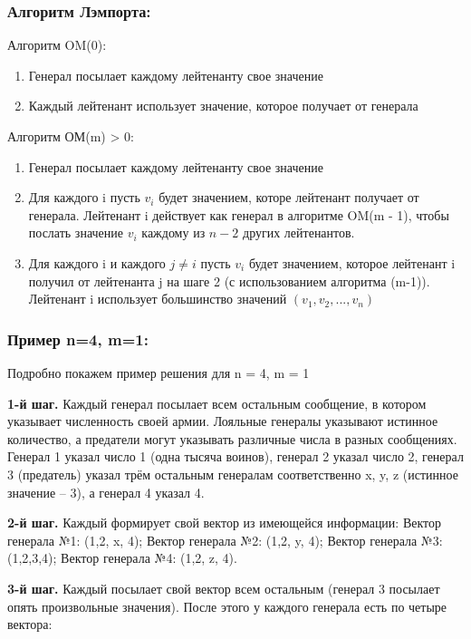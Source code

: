 \documentclass[a4paper,12pt]{article}
\begin{document}
\subsubsection{Алгоритм Лэмпорта:}

Алгоритм OM(0):
\begin{enumerate}
    \item Генерал посылает каждому лейтенанту свое значение
    \item Каждый лейтенант использует значение, которое получает от генерала
\end{enumerate}

Алгоритм ОМ(m) > 0:
\begin{enumerate}
    \item Генерал посылает каждому лейтенанту свое значение
    \item Для каждого i пусть $v_i$ будет значением, которе лейтенант получает
        от генерала. Лейтенант i действует как генерал в алгоритме OM(m - 1),
        чтобы послать значение $v_i$ каждому из $n-2$ других лейтенантов.
    \item Для каждого i и каждого $j \neq i$ пусть $v_i$ будет значением,
        которое лейтенант i получил от лейтенанта j на шаге 2 (с использованием
        алгоритма (m-1)). Лейтенант i использует большинство значений 
        $(v_1, v_2, ..., v_n)$
\end{enumerate}

\subsubsection{Пример n=4, m=1:}
Подробно покажем пример решения для n = 4, m = 1

\textbf{1-й шаг.} Каждый генерал посылает всем остальным сообщение, в котором указывает
численность своей армии. Лояльные генералы указывают истинное количество, а предатели
могут указывать различные числа в разных сообщениях. Генерал 1 указал число 1 (одна
тысяча воинов), генерал 2 указал число 2, генерал 3 (предатель) указал трём остальным
генералам соответственно x, y, z (истинное значение – 3), а генерал 4 указал 4.

\textbf{2-й шаг.} Каждый формирует свой вектор из имеющейся информации:
Вектор генерала №1: (1,2, x, 4);
Вектор генерала №2: (1,2, y, 4);
Вектор генерала №3: (1,2,3,4);
Вектор генерала №4: (1,2, z, 4).

\textbf{3-й шаг.} Каждый посылает свой вектор всем остальным (генерал 3 посылает опять
произвольные значения).
После этого у каждого генерала есть по четыре вектора:
\end{document}
